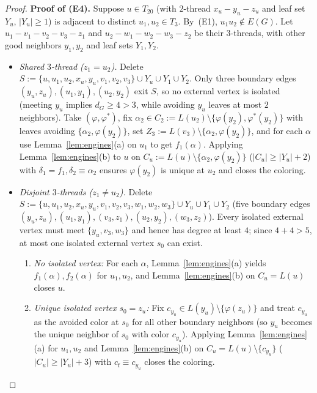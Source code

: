 \documentclass[11pt,a4paper]{article}
\theoremstyle{definition}
\begin{document}
\begin{proof}
\medskip
\noindent\textbf{Proof of (E4).} Suppose $u \in T_{20}$ (with $2$-thread $x_u - y_u - z_u$ and leaf set $Y_u$, $|Y_u| \ge 1$) is adjacent to distinct $u_1, u_2 \in T_3$. By~(E1), $u_1 u_2 \notin E(G)$. Let $u_1 - v_1 - v_2 - v_3 - z_1$ and $u_2 - w_1 - w_2 - w_3 - z_2$ be their $3$-threads, with other good neighbors $y_1, y_2$ and leaf sets $Y_1, Y_2$.
\begin{itemize}[leftmargin=*,itemsep=2pt]
  \item \emph{Shared $3$-thread ($z_1 = u_2$).} Delete $S := \{u, u_1, u_2, x_u, y_u, v_1, v_2, v_3\} \cup Y_u \cup Y_1 \cup Y_2$. Only three boundary edges $(y_u, z_u), (u_1, y_1), (u_2, y_2)$ exit $S$, so no external vertex is isolated (meeting $y_u$ implies $d_G \ge 4 > 3$, while avoiding $y_u$ leaves at most $2$ neighbors). Take $(\varphi, \varphi^*)$, fix $\alpha_2 \in C_2 := L(u_2) \setminus \{\varphi(y_2), \varphi^*(y_2)\}$ with leaves avoiding $\{\alpha_2, \varphi(y_2)\}$, set $Z_3 := L(v_3) \setminus \{\alpha_2, \varphi(y_2)\}$, and for each $\alpha$ use Lemma~\ref{lem:engines}(a) on $u_1$ to get $f_1(\alpha)$. Applying Lemma~\ref{lem:engines}(b) to $u$ on $C_u := L(u) \setminus \{\alpha_2, \varphi(y_2)\}$ ($|C_u| \ge |Y_u| + 2$) with $\delta_1 = f_1, \delta_2 \equiv \alpha_2$ ensures $\varphi(y_2)$ is unique at $u_2$ and closes the coloring.
  \item \emph{Disjoint $3$-threads ($z_1 \neq u_2$).} Delete $S := \{u, u_1, u_2, x_u, y_u, v_1, v_2, v_3, w_1, w_2, w_3\} \cup Y_u \cup Y_1 \cup Y_2$ (five boundary edges $(y_u, z_u), (u_1, y_1), (v_3, z_1), (u_2, y_2), (w_3, z_2)$). Every isolated external vertex must meet $\{y_u, v_3, w_3\}$ and hence has degree at least $4$; since $4 + 4 > 5$, at most one isolated external vertex $s_0$ can exist.
  \begin{enumerate}[label=\arabic*.,leftmargin=*,itemsep=1pt]
    \item \emph{No isolated vertex:} For each $\alpha$, Lemma~\ref{lem:engines}(a) yields $f_1(\alpha), f_2(\alpha)$ for $u_1, u_2$, and Lemma~\ref{lem:engines}(b) on $C_u = L(u)$ closes $u$.
    \item \emph{Unique isolated vertex $s_0 = z_u$:} Fix $c_{y_u} \in L(y_u) \setminus \{\varphi(z_u)\}$ and treat $c_{y_u}$ as the avoided color at $s_0$ for all other boundary neighbors (so $y_u$ becomes the unique neighbor of $s_0$ with color $c_{y_u}$). Applying Lemma~\ref{lem:engines}(a) for $u_1, u_2$ and Lemma~\ref{lem:engines}(b) on $C_u = L(u) \setminus \{c_{y_u}\}$ ($|C_u| \ge |Y_u| + 3$) with $c_{\mathrm{f}} \equiv c_{y_u}$ closes the coloring.

\end{enumerate}
\end{itemize}
\end{proof}
\end{document}
